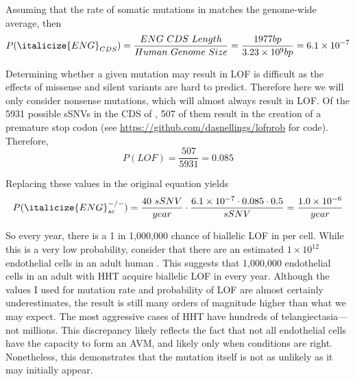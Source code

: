 Assuming that the rate of somatic mutations in  matches the genome-wide average, then 
\begin{equation*}
P(\italicize{ENG}_{CDS}) = \frac{ENG~CDS~Length}{Human~Genome~Size} = \frac{1977 bp}{3.23 \times 10^9 bp} = 6.1 \times 10^{-7}
\end{equation*}

Determining whether a given mutation may result in LOF is difficult as the effects of missense and silent variants are hard to predict. Therefore here we will only consider nonsense mutations, which will almost always result in LOF. Of the 5931 possible sSNVs in the CDS of , 507 of them result in the creation of a premature stop codon (see \url{https://github.com/dasnellings/lofprob} for code). Therefore,
\begin{equation*}
P(LOF) = \frac{507}{5931} = 0.085
\end{equation*}

Replacing these values in the original equation yields
\begin{equation*}
P(\italicize{ENG}_{sc}^{-/-}) = \frac{40~sSNV}{year} \cdot \frac{6.1 \times 10^{-7} \cdot 0.085 \cdot 0.5}{sSNV} = \frac{1.0 \times 10^{-6}}{year}
\end{equation*}

So every year, there is a 1 in 1,000,000 chance of biallelic LOF in  per cell. While this is a very low probability, consider that there are an estimated $1 \times 10^{12}$ endothelial cells in an adult human \citep{jaffe1987}. This suggests that 1,000,000 endothelial cells in an adult with HHT acquire biallelic LOF in  every year. Although the values I used for mutation rate and probability of LOF are almost certainly underestimates, the result is still many orders of magnitude higher than what we may expect. The most aggressive cases of HHT have hundreds of telangiectasia---not millions. This discrepancy likely reflects the fact that not all endothelial cells have the capacity to form an AVM, and likely only when conditions are right. Nonetheless, this demonstrates that the mutation itself is not as unlikely as it may initially appear. 





